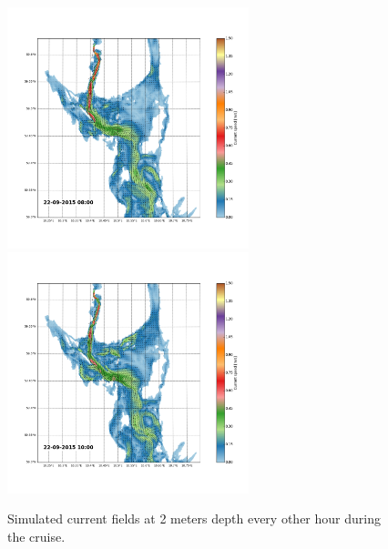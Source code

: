 \documentclass[12pt,a4paper,english]{article}
\begin{document}
\begin{figure}[h]
{}
\centerline{
\includegraphics*[trim=2.0cm 3cm 6.0cm 3.5cm,clip=true,height=7cm]{Python/stromfelt_90}
\includegraphics*[trim=3.7cm 3cm 1.3cm 3.5cm,clip=true,height=7cm]{Python/stromfelt_92}
}
\caption{\small 
Simulated current fields at 2 meters depth every other hour during the cruise.}
\label{fig:Current2}
\end{figure}
\end{document}
